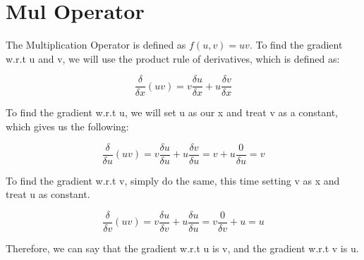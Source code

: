 \documentclass{article}
\begin{document}
    \section{Mul Operator}
            The Multiplication Operator is defined as $f(u, v) = uv$. To find the gradient w.r.t 
        u and v, we will use the product rule of derivatives, which is defined as:

        $$\frac{\delta}{\delta{x}}(uv) = v\frac{\delta{u}}{\delta{x}} + u\frac{\delta{v}}{\delta{x}}$$

        To find the gradient w.r.t u, we will set u as our x and treat v as a constant, 
        which gives us the following:

        $$\frac{\delta}{\delta{u}}(uv) = v\frac{\delta{u}}{\delta{u}} + u\frac{\delta{v}}{\delta{u}} = v + u\frac{0}{\delta{u}} = v$$

        To find the gradient w.r.t v, simply do the same, this time setting v as x and treat u as constant.

        $$\frac{\delta}{\delta{v}}(uv) = v\frac{\delta{u}}{\delta{v}} + u\frac{\delta{u}}{\delta{u}} = v\frac{0}{\delta{v}} + u = u$$

        Therefore, we can say that the gradient w.r.t u is v, and the gradient w.r.t v is u. 
\end{document}
